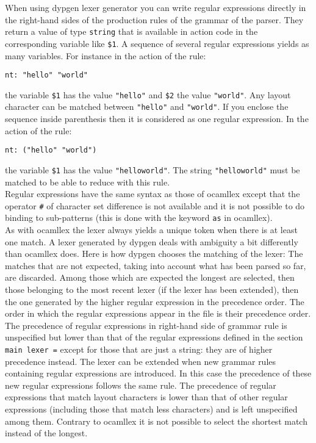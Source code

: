 \documentclass[12pt]{article}
\begin{document}
{When using dypgen lexer generator you can write regular expressions directly in the right-hand sides of the production rules of the grammar of the parser. They return a value of type \verb|string| that is available in action code in the corresponding variable like \verb|$1|. A sequence of several regular expressions yields as many variables. For instance in the action of the rule:
\begin{verbatim}
nt: "hello" "world"
\end{verbatim}
the variable \verb|$1| has the value \verb|"hello"| and \verb|$2| the value \verb|"world"|. Any layout character can be matched between \verb|"hello"| and \verb|"world"|. If you enclose the sequence inside parenthesis then it is considered as one regular expression. In the action of the rule:
\begin{verbatim}
nt: ("hello" "world")
\end{verbatim}
the variable \verb|$1| has the value \verb|"helloworld"|. The string \verb|"helloworld"| must be matched to be able to reduce with this rule.\\

Regular expressions have the same syntax as those of ocamllex except that the operator \verb|#| of character set difference is not available and it is not possible to do binding to sub-patterns (this is done with the keyword \verb|as| in ocamllex).\\

As with ocamllex the lexer always yields a unique token when there is at least one match. A lexer generated by dypgen deals with ambiguity a bit differently than ocamllex does. Here is how dypgen chooses the matching of the lexer:
The matches that are not expected, taking into account what has been parsed so far, are discarded. Among those which are expected the longest are selected, then those belonging to the most recent lexer (if the lexer has been extended), then the one generated by the higher regular expression in the precedence order. The order in which the regular expressions appear in the file is their precedence order. The precedence of regular expressions in right-hand side of grammar rule is unspecified but lower than that of the regular expressions defined in the section \verb|main lexer =| except for those that are just a string: they are of higher precedence instead. The lexer can be extended when new grammar rules containing regular expressions are introduced. In this case the precedence of these new regular expressions follows the same rule. The precedence of regular expressions that match layout characters is lower than that of other regular expressions (including those that match less characters) and is left unspecified among them. Contrary to ocamllex it is not possible to select the shortest match instead of the longest.\\

}
\end{document}
